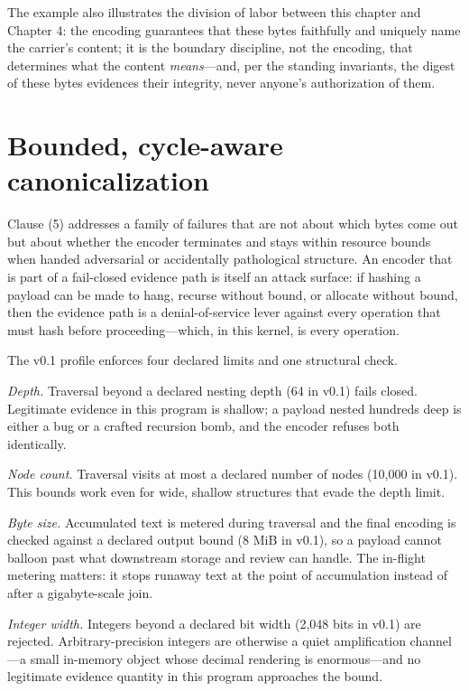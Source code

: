 The example also illustrates the division of labor between this chapter
and Chapter 4: the encoding guarantees that these bytes faithfully and
uniquely name the carrier's content; it is the boundary discipline, not
the encoding, that determines what the content \emph{means}---and, per
the standing invariants, the digest of these bytes evidences their
integrity, never anyone's authorization of them.

\section{Bounded, cycle-aware canonicalization}\label{ch05:bounded}

Clause (5) addresses a family of failures that are not about which bytes
come out but about whether the encoder terminates and stays within resource
bounds when handed adversarial or accidentally pathological structure. An
encoder that is part of a fail-closed evidence path is itself an attack
surface: if hashing a payload can be made to hang, recurse without bound, or
allocate without bound, then the evidence path is a denial-of-service lever
against every operation that must hash before proceeding---which, in this
kernel, is every operation.

The v0.1 profile enforces four declared limits and one structural check.

\emph{Depth.} Traversal beyond a declared nesting depth (64 in v0.1) fails
closed. Legitimate evidence in this program is shallow; a payload nested
hundreds deep is either a bug or a crafted recursion bomb, and the encoder
refuses both identically.

\emph{Node count.} Traversal visits at most a declared number of nodes
(10{,}000 in v0.1). This bounds work even for wide, shallow structures that
evade the depth limit.

\emph{Byte size.} Accumulated text is metered during traversal and the final
encoding is checked against a declared output bound (8 MiB in v0.1), so a
payload cannot balloon past what downstream storage and review can handle.
The in-flight metering matters: it stops runaway text at the point of
accumulation instead of after a gigabyte-scale join.

\emph{Integer width.} Integers beyond a declared bit width (2{,}048 bits in
v0.1) are rejected. Arbitrary-precision integers are otherwise a quiet
amplification channel---a small in-memory object whose decimal rendering is
enormous---and no legitimate evidence quantity in this program approaches
the bound.

